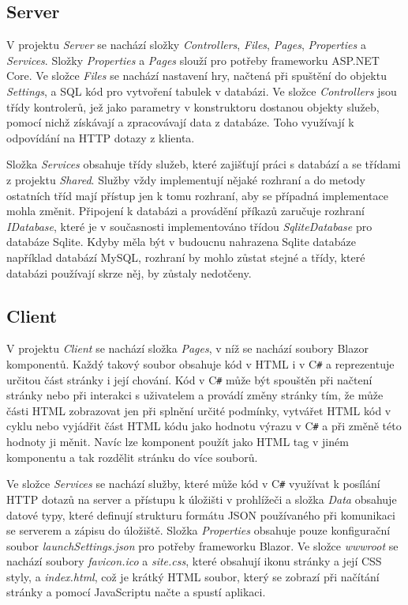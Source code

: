 \documentclass[a4paper,12pt]{article}
\def\CS{C\texttt{\#}}
\begin{document}
\subsection{Server}
V projektu \textit{Server} se nachází složky \textit{Controllers}, \textit{Files}, \textit{Pages}, \textit{Properties} a \textit{Services}. Složky \textit{Properties} a \textit{Pages} slouží pro potřeby frameworku ASP.NET Core. Ve složce \textit{Files} se nachází nastavení hry, načtená při spuštění do objektu \textit{Settings}, a SQL kód pro vytvoření tabulek v databázi. Ve složce \textit{Controllers} jsou třídy kontrolerů, jež jako parametry v konstruktoru dostanou objekty služeb, pomocí nichž získávají a zpracovávají data z databáze. Toho využívají k odpovídání na HTTP dotazy z klienta.

Složka \textit{Services} obsahuje třídy služeb, které zajišťují práci s databází a se třídami z projektu \textit{Shared}. Služby vždy implementují nějaké rozhraní a do metody ostatních tříd mají přístup jen k tomu rozhraní, aby se případná implementace mohla změnit. Připojení k databázi a provádění příkazů zaručuje rozhraní \textit{IDatabase}, které je v současnosti implementováno třídou \textit{SqliteDatabase} pro databáze Sqlite. Kdyby měla být v budoucnu nahrazena Sqlite databáze například databází MySQL, rozhraní by mohlo zůstat stejné a třídy, které databázi používají skrze něj, by zůstaly nedotčeny.

\subsection{Client}
V projektu \textit{Client} se nachází složka \textit{Pages}, v níž se nachází soubory Blazor komponentů. Každý takový soubor obsahuje kód v HTML i v \CS{} a reprezentuje určitou část stránky i její chování. Kód v \CS{} může být spouštěn při načtení stránky nebo při interakci s uživatelem a provádí změny stránky tím, že může části HTML zobrazovat jen při splnění určité podmínky, vytvářet HTML kód v cyklu nebo vyjádřit část HTML kódu jako hodnotu výrazu v \CS{} a při změně této hodnoty ji měnit. Navíc lze komponent použít jako HTML tag v jiném komponentu a tak rozdělit stránku do více souborů.

Ve složce \textit{Services} se nachází služby, které může kód v \CS{} využívat k posílání HTTP dotazů na server a přístupu k úložišti v prohlížeči a složka \textit{Data} obsahuje datové typy, které definují strukturu formátu JSON používaného při komunikaci se serverem a zápisu do úložiště. Složka \textit{Properties} obsahuje pouze konfigurační soubor \textit{launchSettings.json} pro potřeby frameworku Blazor. Ve složce \textit{wwwroot} se nachází soubory \textit{favicon.ico} a \textit{site.css}, které obsahují ikonu stránky a její CSS styly, a \textit{index.html}, což je krátký HTML soubor, který se zobrazí při načítání stránky a pomocí JavaScriptu načte a spustí aplikaci.

\newpage
\printbibliography[heading=bibintoc, title={Použitá literatura}]
\end{document}
